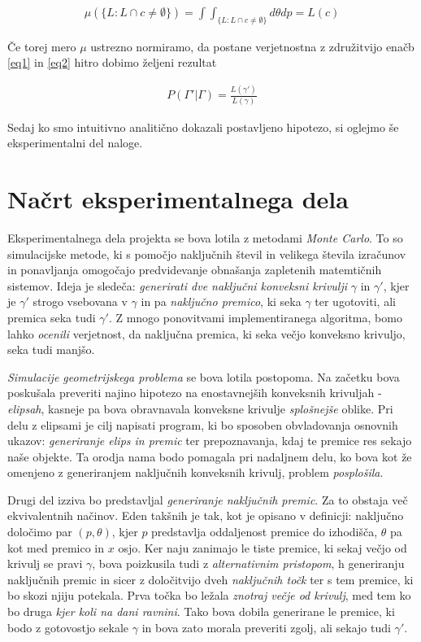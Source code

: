 \documentclass[a4paper]{article}
\begin{document}
\begin{align}
\mu(\{L:L \cap c \ne \emptyset \}) = \int \int _{\{L:L \cap c \ne \emptyset \}} d\theta dp = L(c) \label{eq2}
\end{align}

Če torej mero $\mu$ ustrezno normiramo, da postane verjetnostna z združitvijo enačb  \ref{eq1} in \ref{eq2} hitro dobimo željeni rezultat

\begin{align}
P(\Gamma' | \Gamma) = \frac{L(\gamma')}{L(\gamma)}
\end{align}

Sedaj ko smo intuitivno analitično dokazali postavljeno hipotezo, si oglejmo še eksperimentalni del naloge.







\section{Načrt eksperimentalnega dela}

Eksperimentalnega dela projekta se bova lotila z metodami \textit{Monte Carlo}. To so simulacijske metode, ki s pomočjo naključnih števil in velikega števila izračunov in ponavljanja omogočajo predvidevanje obnašanja zapletenih matemtičnih sistemov. Ideja je sledeča: \textit{generirati dve naključni konveksni krivulji} $\gamma$ in $\gamma'$, kjer je $\gamma'$ strogo vsebovana v $\gamma$ in pa \textit{naključno premico}, ki seka $\gamma$ ter ugotoviti, ali premica seka tudi $\gamma'$. Z mnogo ponovitvami implementiranega algoritma, bomo lahko \textit{ocenili} verjetnost, da naključna premica, ki seka večjo konveksno krivuljo, seka tudi manjšo.

\textit{Simulacije geometrijskega problema} se bova lotila postopoma. Na začetku bova poskušala preveriti najino hipotezo na enostavnejših konveksnih krivuljah - \textit{elipsah}, kasneje pa bova obravnavala konveksne krivulje \textit{splošnejše} oblike. Pri delu z elipsami je cilj napisati program, ki bo sposoben obvladovanja osnovnih ukazov: \textit{generiranje elips in premic} ter prepoznavanja, kdaj te premice res sekajo naše objekte. Ta orodja nama bodo pomagala pri nadaljnem delu, ko bova kot že omenjeno z generiranjem naključnih konveksnih krivulj, problem \textit{posplošila}.

Drugi del izziva bo predstavljal \textit{generiranje naključnih premic}. Za to obstaja več ekvivalentnih načinov. Eden takšnih je tak, kot je opisano v definicji: naključno določimo par $(p,\theta)$, kjer $p$ predstavlja oddaljenost premice do izhodišča, $\theta$ pa kot med premico in $x$ osjo. Ker naju zanimajo le tiste premice, ki sekaj večjo od krivulj se pravi $\gamma$, bova poizkusila tudi z \textit{alternativnim pristopom}, h generiranju naključnih premic in sicer z določitvijo dveh \textit{naključnih točk} ter s tem premice, ki bo skozi njiju potekala. Prva točka bo ležala \textit{znotraj večje od krivulj}, med tem ko bo druga \textit{kjer koli na dani ravnini}. Tako bova dobila generirane le premice, ki bodo z gotovostjo sekale $\gamma$ in bova zato morala preveriti zgolj, ali sekajo tudi $\gamma'$.
\end{document}

